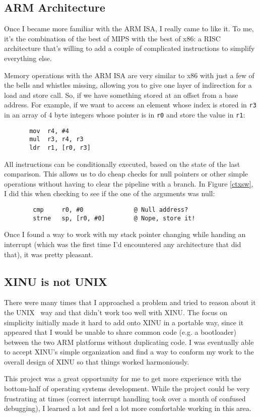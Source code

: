 \documentclass[12pt]{article}
\newcommand{\code}[1]{{\tt #1}}
\newcommand{\unix}[0]{U{\small NIX}}
\begin{document}
\subsection{ARM Architecture}

Once I became more familiar with the ARM ISA, I really came to like it. To me,
it's the combination of the best of MIPS with the best of x86: a RISC
architecture that's willing to add a couple of complicated instructions to
simplify everything else.

Memory operations with the ARM ISA are very similar to x86 with just a few of
the bells and whistles missing, allowing you to give one layer of indirection
for a load and store call. So, if we have something stored at an offset from a
base address. For example, if we want to access an element whose index is
stored in \code{r3} in an array of 4 byte integers whose pointer is in
\code{r0} and store the value in \code{r1}:

\begin{verbatim}
       mov  r4, #4
       mul  r3, r4, r3
       ldr  r1, [r0, r3]
\end{verbatim}

\pagebreak

All instructions can be conditionally executed, based on the state of the last
comparison. This allows us to do cheap checks for null pointers or other simple
operations without having to clear the pipeline with a branch. In Figure
\ref{ctxsw}, I did this when checking to see if the one of the arguments was
null:

\begin{verbatim}
        cmp     r0, #0              @ Null address?
        strne   sp, [r0, #0]        @ Nope, store it!
\end{verbatim}

Once I found a way to work with my stack pointer changing while handing an
interrupt (which was the first time I'd encountered any architecture that did
that), it was pretty pleasant.

\subsection{XINU is not \unix}

There were many times that I approached a problem and tried to reason about it
the \unix~ way and that didn't work too well with XINU.  The focus on
simplicity initially made it hard to add onto XINU in a portable way, since it
appeared that I would be unable to share common code (e.g. a bootloader)
between the two ARM platforms without duplicating code.  I was eventually able
to accept XINU's simple organization and find a way to conform my work to the
overall design of XINU so that things worked harmoniously.

This project was a great opportunity for me to get more experience with the
bottom-half of operating systems development. While the project could be very
frustrating at times (correct interrupt handling took over a month of confused
debugging), I learned a lot and feel a lot more comfortable working in this
area.
\end{document}
